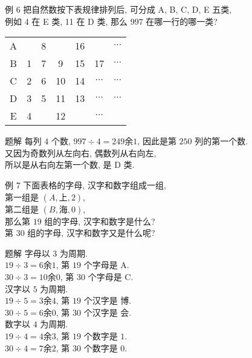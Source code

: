 \documentclass[content.tex]{subfiles}
\begin{document}
\begin{frame}{例 6}
把自然数按下表规律排列后, 可分成 A, B, C, D, E 五类, \\
例如 4 在 E 类, 11 在 D 类, 那么 $997$ 在哪一行的哪一类?
\bigbreak\centering
\begin{tabular}{c|cccccc}
\hline
A && 8 && 16 && $\cdots$ \\
B & 1 & 7 & 9 & 15 & 17 & $\cdots$ \\
C & 2 & 6 & 10 & 14 & $\cdots$ & $\cdots$ \\
D & 3 & 5 & 11 & 13 & $\cdots$ & $\cdots$ \\
E & 4 && 12 && $\cdots$ \\
\hline
\end{tabular}
\begin{exampleblock}{题解}
每列 $4$ 个数, $997\div 4 = 249\text{余}1$, 
因此是第 $250$ 列的第一个数. \\
又因为奇数列从左向右, 偶数列从右向左, \\
所以是从右向左第一个数, 是 D 类.
\end{exampleblock}
\end{frame}

\begin{frame}{例 7}
下面表格的字母, 汉字和数字组成一组, \\
第一组是 $(A, \text{上}, 2)$, \\
第二组是 $(B, \text{海}, 0)$, \\
那么第 $19$ 组的字母, 汉字和数字是什么? \\
第 $30$ 组的字母, 汉字和数字又是什么呢? \\
\begin{exampleblock}{题解}
字母以 $3$ 为周期. \\
$19\div 3 = 6\text{余}1$, 第 $19$ 个字母是 A. \\
$30\div 3 = 10\text{余}0$, 第 $30$ 个字母是 C. \\
汉字以 $5$ 为周期. \\
$19\div 5 = 3\text{余}4$, 第 $19$ 个汉字是 $\text{博}$. \\
$30\div 5 = 6\text{余}0$, 第 $30$ 个汉字是 $\text{会}$. \\
数字以 $4$ 为周期. \\
$19\div 4 = 4\text{余}3$, 第 $19$ 个数字是 $1$. \\
$30\div 4 = 7\text{余}2$, 第 $30$ 个数字是 $0$. \\
\end{exampleblock}
\end{frame}
\end{document}
